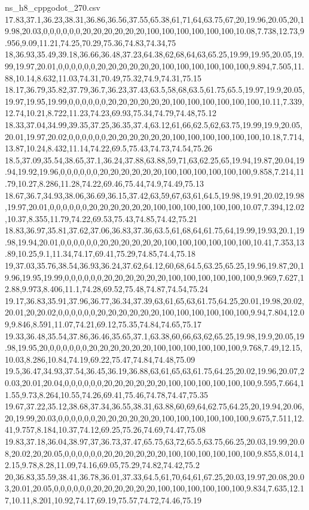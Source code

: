 \begin{filecontents*}[overwrite]{ns_h8_cppgodot_270.csv}
17.83,37.1,36.23,38.31,36.86,36.56,37.55,65.38,61,71,64,63.75,67,20,19.96,20.05,20,19.98,20.03,0,0,0,0,0,0,20,20,20,20,20,20,100,100,100,100,100,100,10.08,7.738,12.73,9.956,9.09,11.21,74.25,70.29,75.36,74.83,74.34,75
18,36.93,35.49,39.18,36.66,36.48,37.23,64.38,62,68,64,63,65.25,19.99,19.95,20.05,19.99,19.97,20.01,0,0,0,0,0,0,20,20,20,20,20,20,100,100,100,100,100,100,9.894,7.505,11.88,10.14,8.632,11.03,74.31,70.49,75.32,74.9,74.31,75.15
18.17,36.79,35.82,37.79,36.7,36.23,37.43,63.5,58,68,63.5,61.75,65.5,19.97,19.9,20.05,19.97,19.95,19.99,0,0,0,0,0,0,20,20,20,20,20,20,100,100,100,100,100,100,10.11,7.339,12.74,10.21,8.722,11.23,74.23,69.93,75.34,74.79,74.48,75.12
18.33,37.04,34.99,39.35,37.25,36.35,37.4,63.12,61,66,62.5,62,63.75,19.99,19.9,20.05,20.01,19.97,20.02,0,0,0,0,0,0,20,20,20,20,20,20,100,100,100,100,100,100,10.18,7.714,13.87,10.24,8.432,11.14,74.22,69.5,75.43,74.73,74.54,75.26
18.5,37.09,35.54,38.65,37.1,36.24,37.88,63.88,59,71,63,62.25,65,19.94,19.87,20.04,19.94,19.92,19.96,0,0,0,0,0,0,20,20,20,20,20,20,100,100,100,100,100,100,9.858,7.214,11.79,10.27,8.286,11.28,74.22,69.46,75.44,74.9,74.49,75.13
18.67,36.7,34.93,38.06,36.69,36.15,37.42,63,59,67,63,61,64.5,19.98,19.91,20.02,19.98,19.97,20.01,0,0,0,0,0,0,20,20,20,20,20,20,100,100,100,100,100,100,10.07,7.394,12.02,10.37,8.355,11.79,74.22,69.53,75.43,74.85,74.42,75.21
18.83,36.97,35.81,37.62,37.06,36.83,37.36,63.5,61,68,64,61.75,64,19.99,19.93,20.1,19.98,19.94,20.01,0,0,0,0,0,0,20,20,20,20,20,20,100,100,100,100,100,100,10.41,7.353,13.89,10.25,9.1,11.34,74.17,69.41,75.29,74.85,74.4,75.18
19,37.03,35.76,38.54,36.93,36.24,37.62,64.12,60,68,64.5,63.25,65.25,19.96,19.87,20,19.96,19.95,19.99,0,0,0,0,0,0,20,20,20,20,20,20,100,100,100,100,100,100,9.969,7.627,12.88,9.973,8.406,11.1,74.28,69.52,75.48,74.87,74.54,75.24
19.17,36.83,35.91,37.96,36.77,36.34,37.39,63,61,65,63,61.75,64.25,20.01,19.98,20.02,20.01,20,20.02,0,0,0,0,0,0,20,20,20,20,20,20,100,100,100,100,100,100,9.94,7.804,12.09,9.846,8.591,11.07,74.21,69.12,75.35,74.84,74.65,75.17
19.33,36.48,35.54,37.86,36.46,35.65,37.1,63.38,60,66,63,62,65.25,19.98,19.9,20.05,19.98,19.95,20,0,0,0,0,0,0,20,20,20,20,20,20,100,100,100,100,100,100,9.768,7.49,12.15,10.03,8.286,10.84,74.19,69.22,75.47,74.84,74.48,75.09
19.5,36.47,34.93,37.54,36.45,36.19,36.88,63,61,65,63,61.75,64.25,20.02,19.96,20.07,20.03,20.01,20.04,0,0,0,0,0,0,20,20,20,20,20,20,100,100,100,100,100,100,9.595,7.664,11.55,9.73,8.264,10.55,74.26,69.41,75.46,74.78,74.47,75.35
19.67,37.22,35.12,38.68,37.34,36.55,38.31,63.88,60,69,64,62.75,64.25,20,19.94,20.06,20,19.99,20.03,0,0,0,0,0,0,20,20,20,20,20,20,100,100,100,100,100,100,9.675,7.511,12.41,9.757,8.184,10.37,74.12,69.25,75.26,74.69,74.47,75.08
19.83,37.18,36.04,38.97,37,36.73,37.47,65.75,63,72,65.5,63.75,66.25,20.03,19.99,20.08,20.02,20,20.05,0,0,0,0,0,0,20,20,20,20,20,20,100,100,100,100,100,100,9.855,8.014,12.15,9.78,8.28,11.09,74.16,69.05,75.29,74.82,74.42,75.2
20,36.83,35.59,38.41,36.78,36.01,37.33,64.5,61,70,64,61,67.25,20.03,19.97,20.08,20.03,20.01,20.05,0,0,0,0,0,0,20,20,20,20,20,20,100,100,100,100,100,100,9.834,7.635,12.17,10.11,8.201,10.92,74.17,69.19,75.57,74.72,74.46,75.19
\end{filecontents*}

